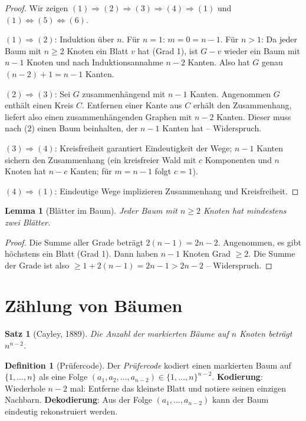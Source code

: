 ﻿\documentclass[a4paper,12pt,openany,oneside]{book}
\theoremstyle{definition}
\newtheorem{definition}{Definition}[chapter]
\theoremstyle{plain}
\newtheorem{satz}{Satz}[chapter]
\newtheorem{lemma}{Lemma}[chapter]
\theoremstyle{remark}
\begin{document}
\begin{proof}
  Wir zeigen $(1) \Rightarrow (2) \Rightarrow (3) \Rightarrow (4) \Rightarrow (1)$
  und $(1) \Leftrightarrow (5) \Leftrightarrow (6)$.

  $(1) \Rightarrow (2)$: Induktion \"uber $n$. F\"ur $n=1$: $m=0=n-1$.
  F\"ur $n>1$: Da jeder Baum mit $n \geq 2$ Knoten ein Blatt $v$ hat
  (Grad 1), ist $G - v$ wieder ein Baum mit $n-1$ Knoten und nach
  Induktionsannahme $n-2$ Kanten. Also hat $G$ genau $(n-2)+1 = n-1$ Kanten.

  $(2) \Rightarrow (3)$: Sei $G$ zusammenh\"angend mit $n-1$ Kanten.
  Angenommen $G$ enth\"alt einen Kreis $C$. Entfernen einer Kante aus $C$
  erh\"alt den Zusammenhang, liefert also einen zusammenh\"angenden Graphen
  mit $n-2$ Kanten. Dieser muss nach (2) einen Baum beinhalten, der
  $n-1$ Kanten hat -- Widerspruch.

  $(3) \Rightarrow (4)$: Kreisfreiheit garantiert Eindeutigkeit der Wege;
  $n-1$ Kanten sichern den Zusammenhang (ein kreisfreier Wald mit $c$
  Komponenten und $n$ Knoten hat $n-c$ Kanten; f\"ur $m = n-1$ folgt $c=1$).

  $(4) \Rightarrow (1)$: Eindeutige Wege implizieren Zusammenhang und
  Kreisfreiheit.
\end{proof}

\begin{lemma}[Bl\"atter im Baum]
  Jeder Baum mit $n \geq 2$ Knoten hat mindestens zwei Bl\"atter.
\end{lemma}

\begin{proof}
  Die Summe aller Grade betr\"agt $2(n-1) = 2n-2$. Angenommen, es gibt
  h\"ochstens ein Blatt (Grad 1). Dann haben $n-1$ Knoten Grad $\geq 2$.
  Die Summe der Grade ist also $\geq 1 + 2(n-1) = 2n-1 > 2n-2$ -- Widerspruch.
\end{proof}

\section{Z\"ahlung von B\"aumen}

\begin{satz}[Cayley, 1889]
  Die Anzahl der markierten B\"aume auf $n$ Knoten betr\"agt $n^{n-2}$.
\end{satz}

\begin{definition}[Pr\"ufercode]
  Der \emph{Pr\"ufercode} kodiert einen markierten Baum auf $\{1,\ldots,n\}$
  als eine Folge $(a_1, a_2, \ldots, a_{n-2}) \in \{1,\ldots,n\}^{n-2}$.
  \textbf{Kodierung}: Wiederhole $n-2$ mal: Entferne das kleinste Blatt und
  notiere seinen einzigen Nachbarn.
  \textbf{Dekodierung}: Aus der Folge $(a_1,\ldots,a_{n-2})$ kann der Baum
  eindeutig rekonstruiert werden.
\end{definition}
\end{document}
